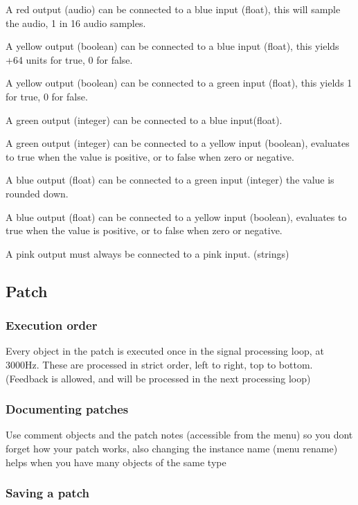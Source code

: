 \begin{DoxyItemize}
\item A red output (audio) can be connected to a blue input (float), this will sample the audio, 1 in 16 audio samples. 
\item A yellow output (boolean) can be connected to a blue input (float), this yields +64 units for true, 0 for false. 
\item A yellow output (boolean) can be connected to a green input (float), this yields 1 for true, 0 for false. 
\item A green output (integer) can be connected to a blue input(float). 
\item A green output (integer) can be connected to a yellow input (boolean), evaluates to true when the value is positive, or to false when zero or negative. 
\item A blue output (float) can be connected to a green input (integer) the value is rounded down. 
\item A blue output (float) can be connected to a yellow input (boolean), evaluates to true when the value is positive, or to false when zero or negative. 
\item A pink output must always be connected to a pink input. (strings) 
\end{DoxyItemize}\hypertarget{axo_gui_axo_gui_axoloti_edit_mode_patch}{}\subsection{Patch}\label{axo_gui_axo_gui_axoloti_edit_mode_patch}
\hypertarget{axo_gui_axo_gui_axoloti_edit_mode_patch_execution_order}{}\subsubsection{Execution order}\label{axo_gui_axo_gui_axoloti_edit_mode_patch_execution_order}
Every object in the patch is executed once in the signal processing loop, at 3000\+Hz. These are processed in strict order, left to right, top to bottom. (Feedback is allowed, and will be processed in the next processing loop)\hypertarget{axo_gui_axo_gui_axoloti_edit_mode_patch_document_patch}{}\subsubsection{Documenting patches}\label{axo_gui_axo_gui_axoloti_edit_mode_patch_document_patch}
Use comment objects and the patch notes (accessible from the menu) so you don\textquotesingle{}t forget how your patch works, also changing the instance name (menu rename) helps when you have many objects of the same type\hypertarget{axo_gui_axo_gui_axoloti_edit_mode_patch_saving_patch}{}\subsubsection{Saving a patch}\label{axo_gui_axo_gui_axoloti_edit_mode_patch_saving_patch}
